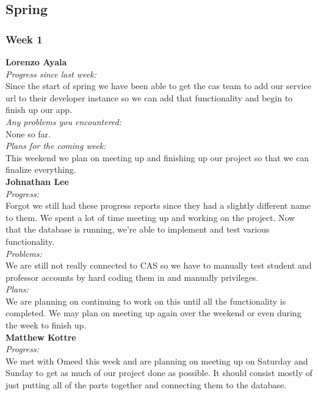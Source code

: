 \subsection{Spring}
\subsubsection{Week 1}

\textbf{Lorenzo Ayala}\\
\noindent\textit{Progress since last week:}\\
Since the start of spring we have been able to get the cas team to add our service url to their developer instance so we can add that functionality and begin to finish up our app. \\ 

\noindent\textit{Any problems you encountered:}\\
\noindent None so far.\\

\noindent\textit{Plans for the coming week:}\\
\noindent This weekend we plan on meeting up and finishing up our project so that we can finalize everything.\\

\noindent\textbf{Johnathan Lee}\\
\noindent\textit{Progress:}\\
Forgot we still had these progress reports since they had a slightly different name to them. We spent a lot of time meeting up and working on the project. Now that the database is running, we're able to implement and test various functionality. \\ 

\noindent\textit{Problems:}\\
\noindent We are still not really connected to CAS so we have to manually test student and professor accounts by hard coding them in and manually privileges.\\

\noindent\textit{Plans:}\\
\noindent We are planning on continuing to work on this until all the functionality is completed. We may plan on meeting up again over the weekend or even during the week to finish up.\\

\noindent\textbf{Matthew Kottre}\\
\noindent\textit{Progress:}\\
We met with Omeed this week and are planning on meeting up on Saturday and Sunday to get as much of our project done as possible. It should consist mostly of just putting all of the parts together and connecting them to the database.\\

